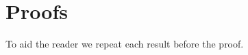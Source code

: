 

\section{Proofs}
\label{sec:proofs}

To aid the reader we repeat each result before the proof.



